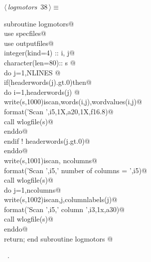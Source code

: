 \documentclass[10pt,a4paper,notitlepage]{article}
\begin{document}
\begin{flushleft} \small
\begin{minipage}{\linewidth}\label{scrap41}\raggedright\small
{} $\langle\,${\it logmotors}\nobreak\ {\footnotesize {38}}$\,\rangle\equiv$
\vspace{-1ex}
\begin{list}{}{} \item
\mbox{}\verb@      subroutine logmotors@\\
\mbox{}\verb@      use specfiles@\\
\mbox{}\verb@      use outputfiles@\\
\mbox{}\verb@      integer(kind=4) :: i, j@\\
\mbox{}\verb@      character(len=80):: s      @\\
\mbox{}\verb@      do j=1,NLINES @\\
\mbox{}\verb@        if(headerwords(j).gt.0)then@\\
\mbox{}\verb@          do i=1,headerwords(j) @\\
\mbox{}\verb@            write(s,1000)iscan,words(i,j),wordvalues(i,j)@\\
\mbox{}        format('Scan ',i5,1X,a20,1X,f16.8)@\\
\mbox{}\verb@            call wlogfile(s)@\\
\mbox{}\verb@          enddo@\\
\mbox{}\verb@        endif ! headerwords(j.gt.0)@\\
\mbox{}\verb@      enddo@\\
\mbox{}\verb@      write(s,1001)iscan, ncolumns@\\
\mbox{}  format('Scan ',i5,' number of columns = ',i5)@\\
\mbox{}\verb@      call wlogfile(s)@\\
\mbox{}\verb@      do j=1,ncolumns@\\
\mbox{}\verb@        write(s,1002)iscan,j,columnlabels(j)@\\
\mbox{}    format('Scan ',i5,' column ',i3,1x,a30)@\\
\mbox{}\verb@        call wlogfile(s)@\\
\mbox{}\verb@      enddo@\\
\mbox{}\verb@      return; end subroutine logmotors                                       @{\NWsep}
\end{list}
\vspace{-1.5ex}
\footnotesize
\begin{list}{}{\setlength{\itemsep}{-\parsep}\setlength{\itemindent}{-\leftmargin}}
\item \NWtxtMacroRefIn\ .

\item{}
\end{list}
\end{minipage}\vspace{4ex}
\end{flushleft}
\end{document}
